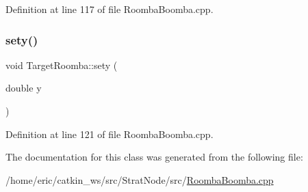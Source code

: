 Definition at line 117 of file Roomba\+Boomba.\+cpp.

\mbox{\label{classTargetRoomba_a254ee1a583a2c980f9e76d472febe315}} 
\subsubsection{\texorpdfstring{sety()}{sety()}}
{\footnotesize\ttfamily void Target\+Roomba\+::sety (\begin{DoxyParamCaption}\item[{double}]{y }\end{DoxyParamCaption})\hspace{0.3cm}{\ttfamily [inline]}}



Definition at line 121 of file Roomba\+Boomba.\+cpp.



The documentation for this class was generated from the following file\+:\begin{DoxyCompactItemize}
\item 
/home/eric/catkin\+\_\+ws/src/\+Strat\+Node/src/\mbox{\hyperlink{RoombaBoomba_8cpp}{Roomba\+Boomba.\+cpp}}\end{DoxyCompactItemize}
